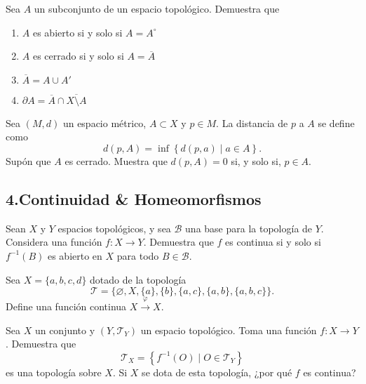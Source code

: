 \documentclass[b5paper,10pt,twoside]{book}
\begin{document}
\begin{problem}
Sea \(A\) un subconjunto de un espacio topológico.
Demuestra que 
\begin{enumerate}[label=(\roman*)]
\item \(A\) es abierto si y solo si \(A = A^\circ\)
\item \(A\) es cerrado si y solo si \(A = \overline{A}\)
\item \(\overline{A} = A \cup A'\)
\item \(\partial A = \overline{A}\cap \overline{X\setminus A}   \)
\end{enumerate}
\end{problem}

\begin{problem}
Sea \((M,d)\) un espacio métrico,
\(A\subset X\) y \(p\in M\).
La distancia de \(p\) a \(A\)
se define como 
\[
d(p,A) = \inf\left\{ d(p,a)\mid a\in A \right\}.
\]
Supón que \(A\) es cerrado.
Muestra que \(d(p,A) = 0\) si, y solo si, \(p\in A\).
\end{problem}


\subsection*{4.\enspace Continuidad \& Homeomorfismos}

\begin{problem}
Sean \(X\) y \(Y\) espacios topológicos, y 
sea \(\mathcal{B}\)  una base para la topología de \(Y\).
Considera una función \(f\colon X\to Y\).
Demuestra que \(f\)
es continua si y solo si \(f^{-1}(B)\) es abierto en \(X\) para todo \(B\in \mathcal{B}\).
\end{problem}


\begin{problem}
Sea $X = \{a, b, c, d\}$ dotado de la topología
\[
\mathcal{T} = \{\varnothing, X, \{a\}, \{b\}, \{a, c\}, \{a, b\}, \{a, b, c\}\}.
\]
Define una función continua \(X\xrightarrow{\varphi} X\).
\end{problem}


\begin{problem}
Sea \(X\) un conjunto y 
\((Y,\mathcal{T}_Y)\) un espacio topológico.
Toma una función \(f\colon X\to Y\).
Demuestra que 
\[
\mathcal{T}_X = \left\{ 
    f^{-1}(O) \mid O\in \mathcal{T}_Y
 \right\}
\]
es una topología sobre \(X\).
Si \(X\) se dota de esta topología,
¿por qué \(f\) es continua?
\end{problem}
\end{document}
